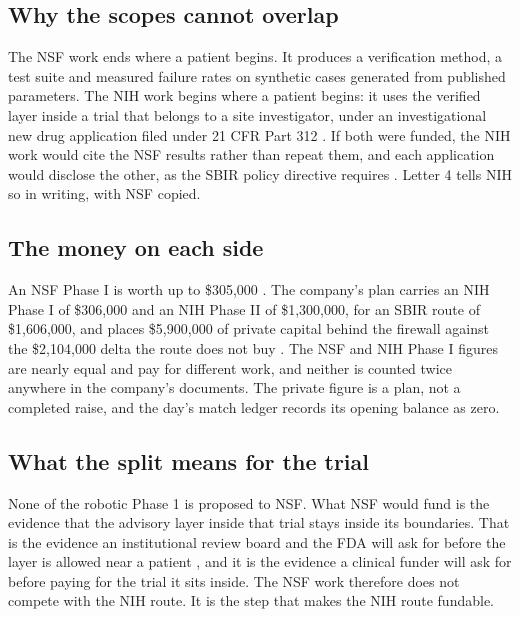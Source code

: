 \subsection{Why the scopes cannot overlap}

The NSF work ends where a patient begins. It produces a verification method, a
test suite and measured failure rates on synthetic cases generated from
published parameters. The NIH work begins where a patient begins: it uses the
verified layer inside a trial that belongs to a site investigator, under an
investigational new drug application filed under 21 CFR Part 312
\cite{ecfr2026part312}. If both were funded, the NIH work would cite the NSF
results rather than repeat them, and each application would disclose the other,
as the SBIR policy directive requires \cite{sbapolicydirective}. Letter 4 tells
NIH so in writing, with NSF copied.

\subsection{The money on each side}

An NSF Phase I is worth up to \$305,000 \cite{nsf26510}. The company's plan
carries an NIH Phase I of \$306,000 and an NIH Phase II of \$1,300,000, for an
SBIR route of \$1,606,000, and places \$5,900,000 of private capital behind the
firewall against the \$2,104,000 delta the route does not buy
\cite{capitalplan2026}. The NSF and NIH Phase I figures are nearly equal and pay
for different work, and neither is counted twice anywhere in the company's
documents. The private figure is a plan, not a completed raise, and the day's
match ledger records its opening balance as zero.

\subsection{What the split means for the trial}

None of the robotic Phase 1 is proposed to NSF. What NSF would fund is the
evidence that the advisory layer inside that trial stays inside its boundaries.
That is the evidence an institutional review board and the FDA will ask for
before the layer is allowed near a patient \cite{fdaaiguidance2025}, and it is
the evidence a clinical funder will ask for before paying for the trial it sits
inside. The NSF work therefore does not compete with the NIH route. It is the
step that makes the NIH route fundable.
